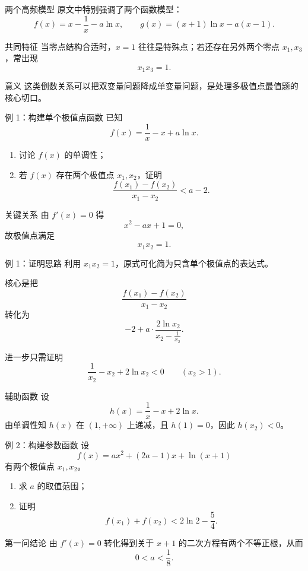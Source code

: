 ﻿\documentclass[aspectratio=169,11pt]{ctexbeamer}
\begin{document}
\begin{frame}{两个高频模型}
\small
原文中特别强调了两个函数模型：
\[
f(x)=x-\frac1x-a\ln x,
\qquad
g(x)=(x+1)\ln x-a(x-1).
\]

\begin{block}{共同特征}
当零点结构合适时，$x=1$ 往往是特殊点；若还存在另外两个零点 $x_1,x_3$，常出现
\[
x_1x_3=1.
\]
\end{block}

\begin{alertblock}{意义}
这类倒数关系可以把双变量问题降成单变量问题，是处理多极值点最值题的核心切口。
\end{alertblock}
\end{frame}

\begin{frame}{例 1：构建单个极值点函数}
\small
已知
\[
f(x)=\frac1x-x+a\ln x.
\]
\begin{enumerate}
  \item 讨论 $f(x)$ 的单调性；
  \item 若 $f(x)$ 存在两个极值点 $x_1,x_2$，证明
  \[
  \frac{f(x_1)-f(x_2)}{x_1-x_2}<a-2.
  \]
\end{enumerate}

\begin{block}{关键关系}
由 $f'(x)=0$ 得
\[
x^2-ax+1=0,
\]
故极值点满足
\[
x_1x_2=1.
\]
\end{block}
\end{frame}

\begin{frame}{例 1：证明思路}
\small
利用 $x_1x_2=1$，原式可化简为只含单个极值点的表达式。

核心是把
\[
\frac{f(x_1)-f(x_2)}{x_1-x_2}
\]
转化为
\[
-2+a\cdot \frac{2\ln x_2}{x_2-\frac1{x_2}}.
\]

进一步只需证明
\[
\frac1{x_2}-x_2+2\ln x_2<0\qquad (x_2>1).
\]

\begin{block}{辅助函数}
设
\[
h(x)=\frac1x-x+2\ln x.
\]
由单调性知 $h(x)$ 在 $(1,+\infty)$ 上递减，且 $h(1)=0$，因此 $h(x_2)<0$。
\end{block}
\end{frame}

\begin{frame}{例 2：构建参数函数}
\small
设
\[
f(x)=ax^2+(2a-1)x+\ln(x+1)
\]
有两个极值点 $x_1,x_2$。

\begin{enumerate}
  \item 求 $a$ 的取值范围；
  \item 证明
  \[
  f(x_1)+f(x_2)<2\ln 2-\frac54.
  \]
\end{enumerate}

\begin{block}{第一问结论}
由 $f'(x)=0$ 转化得到关于 $x+1$ 的二次方程有两个不等正根，从而
\[
\boxed{0<a<\frac18}.
\]
\end{block}
\end{frame}
\end{document}
